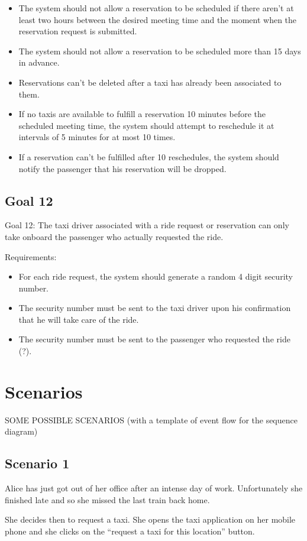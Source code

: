 \begin{itemize}
\item The system should not allow a reservation to be scheduled if there aren’t at least two hours between the desired meeting time and the moment when the reservation request is submitted. 
\item The system should not allow a reservation to be scheduled more than 15 days in advance.
\item Reservations can’t be deleted after a taxi has already been associated to them.
\item If no taxis are available to fulfill a reservation 10 minutes before the scheduled meeting time, the system should attempt to reschedule it at intervals of 5 minutes for at most 10 times.
\item If a reservation can’t be fulfilled after 10 reschedules, the system should notify the passenger that his reservation will be dropped. 
\end{itemize}

\subsection{Goal 12}
Goal 12: The taxi driver associated with a ride request or reservation can only take onboard the passenger who actually requested the ride.

Requirements:
\begin{itemize}
\item For each ride request, the system should generate a random 4 digit security number.
\item The security number must be sent to the taxi driver upon his confirmation that he will take care of the ride.
\item The security number must be sent to the passenger who requested the ride (?).
\end{itemize}

\section{Scenarios}
SOME POSSIBLE SCENARIOS
(with a template of event flow for the sequence diagram)
\subsection{Scenario 1}
Alice has just got out of her office after an intense day of work. Unfortunately she finished late and so she missed the last train back home.

She decides then to request a taxi. She opens the taxi application on her mobile phone and she clicks on the “request a taxi for this location” button.

